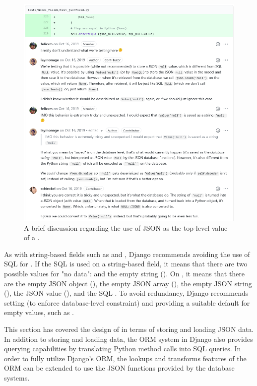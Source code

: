 \begin{figure}
	\centering
    \includegraphics[width=1.0\textwidth]{pics/null_discussion.png}
	\caption{A brief discussion regarding the use of JSON  as the
	top-level value of a .}
	\label{fig:nulldiscussion}
\end{figure}

As with string-based fields such as  and ,
Django recommends avoiding the use of SQL  for . If
the SQL  is used on a string-based field, it means that there are
two possible values for "no data":  and the empty string
(). On , it means that there are the empty JSON object
(), the empty JSON array (), the empty JSON string
(), the JSON  value (), and the SQL
. To avoid redundancy, Django recommends setting 
(to enforce database-level  constraint) and providing a suitable
default for empty values, such as .

This section has covered the design of  in terms of storing and
loading JSON data. In addition to storing and loading data, the ORM system in
Django also provides querying capabilities by translating Python method calls
into SQL  queries. In order to fully utilize Django's ORM, the
lookups and transforms features of the ORM can be extended to use the JSON
functions provided by the database systems.

